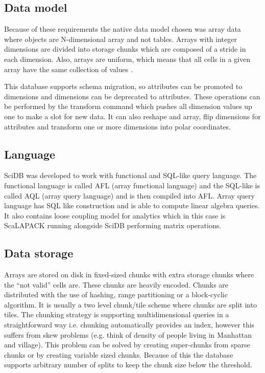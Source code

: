 \subsection{Data model}

Because of these requirements the native data model chosen was array data where objects are N-dimensional array and not tables. Arrays with integer dimensions are divided into storage chunks which are composed of a stride in each dimension. Also, arrays are uniform, which means that all cells in a given array have the same collection of values \cite{scidb}.

This database supports schema migration, so attributes can be promoted to dimensions and dimensions can be deprecated to attributes. These operations can be performed by the transform command which pushes all dimension values up one to make a slot for new data. It can also reshape and array, flip dimensions for attributes and transform one or more dimensions into polar coordinates.

\subsection{Language}

SciDB was developed to work with functional and SQL-like query language. The functional language is called AFL (array functional language) and the SQL-like is called AQL (array query language) and is then compiled into AFL. Array query language has SQL like construction and is able to compute linear algebra queries. It also contains loose coupling model for analytics which in this case is ScaLAPACK running alongside SciDB performing matrix operations.

\subsection{Data storage}
Arrays are stored on disk in fixed-sized chunks with extra storage chunks where the ``not valid'' cells are. These chunks are heavily encoded. Chunks are distributed with the use of hashing, range partitioning or a block-cyclic algorithm. It is usually a two level chunk/tile scheme where chunks are split into tiles. The chunking strategy is supporting multidimensional queries in a straightforward way i.e. chunking automatically provides an index, however this suffers from skew problems (e.g. think of density of people living in Manhattan and village). This problem can be solved by creating super-chunks from sparse chunks or by creating variable sized chunks. Because of this the database supports arbitrary number of splits to keep the chunk size below the threshold.

